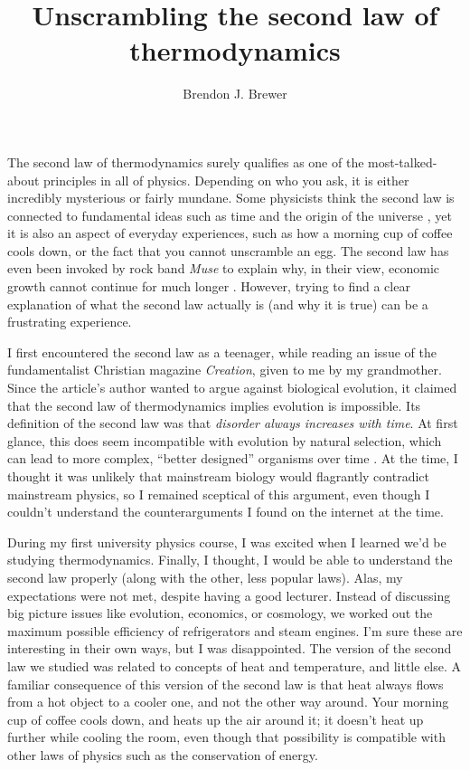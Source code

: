 \documentclass[a4paper, 12pt]{article}
\title{Unscrambling the second law of thermodynamics}
\author{Brendon J. Brewer}
\begin{document}
\sffamily
\maketitle

The second law of thermodynamics surely qualifies as one of the
most-talked-about principles in all of physics. Depending on who you ask, it is
either incredibly mysterious or fairly mundane. Some physicists think
the second law is connected to
fundamental ideas such as time and the origin of the universe
\citep{carroll}, yet it is also an aspect of everyday experiences,
such as how a morning cup of coffee cools down,
or the fact that you cannot unscramble an egg.
The second law has even been invoked by rock band {\em Muse} to
explain why, in their
view, economic growth cannot continue for much longer \citep{muse}.
However, trying to find a clear explanation of what the second law actually is
(and why it is true) can be a frustrating experience.

I first encountered the second law
as a teenager, while reading an issue of the fundamentalist Christian magazine
{\em Creation}, given to me by my grandmother. Since the article's author wanted to
argue against biological evolution, it claimed that the second law of
thermodynamics implies evolution is impossible. Its definition of the second
law was that {\em disorder always increases with time}.
At first glance, this does seem incompatible with evolution by
natural selection, which can lead to more complex,
``better designed'' organisms over time \citep{dawkins}.
At the time, I thought it was unlikely that mainstream biology would flagrantly
contradict mainstream physics, so I remained sceptical of this argument,
even though I couldn't understand the counterarguments I found on the
internet at the time.

During my first university physics course, I was excited when I learned
we'd be
studying thermodynamics. Finally, I thought, I would be able to understand the
second law properly (along with the other, less popular laws).
Alas, my expectations were not met, despite having a good lecturer.
Instead of discussing big picture issues like evolution, economics, or
cosmology, we
worked out the maximum possible efficiency of refrigerators and steam engines.
I'm sure these are interesting in their own ways, but I was disappointed.
The version of the second law we studied was related to concepts of heat
and temperature, and little else.
A familiar consequence of this version of the second law is that
heat always flows from a hot object to a cooler
one, and not the other way around. Your morning
cup of coffee cools down, and heats up the air around it; it doesn't heat
up further while cooling the room, even though that possibility is compatible
with other laws of physics such as the conservation of energy.
\end{document}
